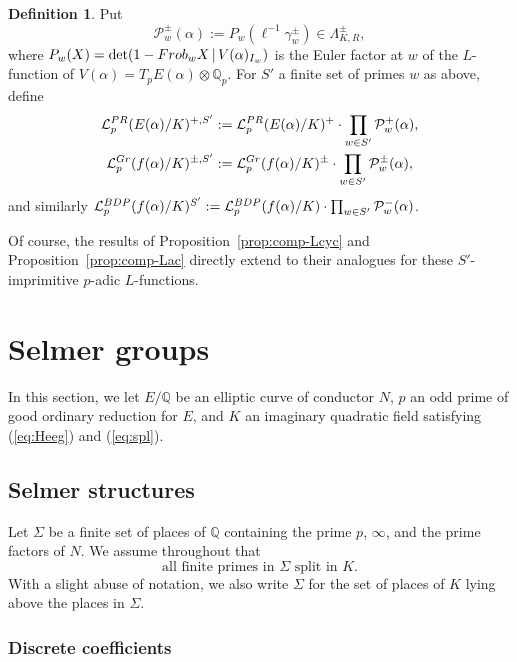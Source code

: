 \documentclass[a4paper,10pt]{amsart}
\numberwithin{equation}{section}
\numberwithin{equation}{section}
\theoremstyle{plain}
\theoremstyle{definition}
\newtheorem{defi}[thm]{Definition}
\theoremstyle{definition}
\theoremstyle{plain}
\theoremstyle{plain}
\theoremstyle{plain}
\theoremstyle{plain}
\newcommand{\Q}{\mathbb{Q}}
\newcommand{\Lcal}{\mathcal{L}}
\begin{document}
\begin{defi}\label{def:w-Euler}
Put 
\[
\mathcal{P}^\pm_w(\alpha):=P_w(\ell^{-1}\gamma_w^\pm)\in\Lambda_{K,R}^{\pm},
\]
where $P_w(X)=\det(1-{\rm Frob}_wX\,\vert\,V(\alpha)_{I_w})$ is the Euler factor at $w$ of the $L$-function of $V(\alpha)=T_pE(\alpha)\otimes\Q_p$. For $S'$ a finite set of primes $w$ as above, define
\begin{align*}
\Lcal_{p}^{\rm PR}(E(\alpha)/K)^{+,S'}&:=\Lcal_{p}^{\rm PR}(E(\alpha)/K)^+\cdot\prod_{w\in S'}\mathcal{P}_w^+(\alpha),\\\Lcal_p^{\rm Gr}(f(\alpha)/K)^{\pm,S'}&:=\Lcal_p^{\rm Gr}(f(\alpha)/K)^\pm\cdot\prod_{w\in S'}\mathcal{P}^\pm_w(\alpha),
\end{align*}
and similarly $\Lcal_p^{\rm BDP}(f(\alpha)/K)^{S'}:=\Lcal_p^{\rm BDP}(f(\alpha)/K)\cdot\prod_{w\in S'}\mathcal{P}^-_w(\alpha)$.
\end{defi}

Of course, the results of Proposition~\ref{prop:comp-Lcyc} and Proposition~\ref{prop:comp-Lac} directly extend to their analogues for these $S'$-imprimitive $p$-adic $L$-functions.

\section{Selmer groups}\label{sec:Sel}

In this section, we let $E/\Q$ be an elliptic curve of conductor $N$, $p$ an odd  prime of good ordinary reduction for $E$, and $K$ an imaginary quadratic field satisfying (\ref{eq:Heeg}) and (\ref{eq:spl}). 


\subsection{Selmer structures}\label{subsec:Sel-str}

Let $\Sigma$ be a finite set of places of $\Q$ containing the prime $p$, $\infty$, and the prime factors of $N$. We assume throughout that 
\[
\textrm{all finite primes in $\Sigma$ split in $K$.}
\]
With a slight abuse of notation, we 
also write $\Sigma$ 
for the set of places of $K$ lying above the places in $\Sigma$. 


\subsubsection{Discrete coefficients}\label{subsec:discrete-Sel}
\end{document}
